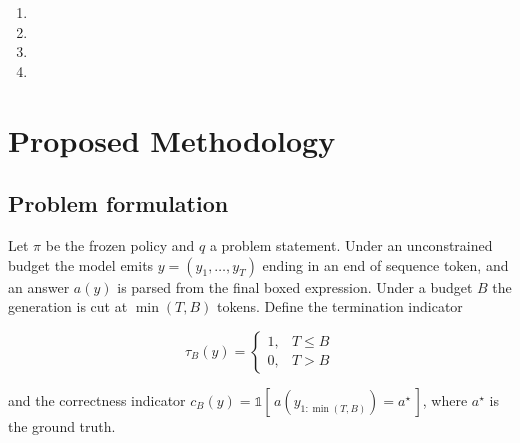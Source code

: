 \documentclass[conference]{IEEEtran}
\newif\ifdraft
\newcommand{\writehere}[2]{%
  \ifdraft
    {\color{orange!75!black}\small\textbf{[WRITE: #1]}\itshape\ #2\par}
    \medskip
  \fi}
\begin{document}
\begin{enumerate}
\item \writehere{Gap 1}{Published accuracies come from uncapped runs and the
degradation curve under realistic budgets is not characterised, though deployment
cost is the main argument for compact models.}
\item \writehere{Gap 2}{Failure analyses report aggregate accuracy without
separating a wrong answer from an absent one, so two failure modes with different
remedies score identically at zero.}
\item \writehere{Gap 3}{Test time scaling methods are evaluated where samples
disagree, so their behaviour where samples agree or produce nothing is untested.}
\item \writehere{Gap 4}{Budget forcing has been evaluated as an extension
mechanism alongside fine tuning, not as a standalone recovery mechanism on a
frozen model, and no measurement exists of whether it can destroy a correct
output.}
\end{enumerate}

\section{Proposed Methodology}

\subsection{Problem formulation}

Let $\pi$ be the frozen policy and $q$ a problem statement. Under an unconstrained
budget the model emits $y = (y_1,\dots,y_T)$ ending in an end of sequence token,
and an answer $a(y)$ is parsed from the final boxed expression. Under a budget $B$
the generation is cut at $\min(T,B)$ tokens. Define the termination indicator

\begin{equation}
\tau_B(y) =
\begin{cases}
1, & T \le B \\
0, & T > B
\end{cases}
\label{eq:tau}
\end{equation}

and the correctness indicator
$c_B(y) = \mathbb{1}[\,a(y_{1:\min(T,B)}) = a^{\star}\,]$, where $a^{\star}$ is
the ground truth.

\writehere{1 paragraph}{
Under the capability hypothesis, truncated traces are wrong because the reasoning
is incomplete, so correctness should fall smoothly across both groups. Under the
termination hypothesis, correctness should be near total among terminated samples
and near zero among truncated ones, as in (\ref{eq:hyp}). Say this is what makes
the two distinguishable by measurement.}
\end{document}
